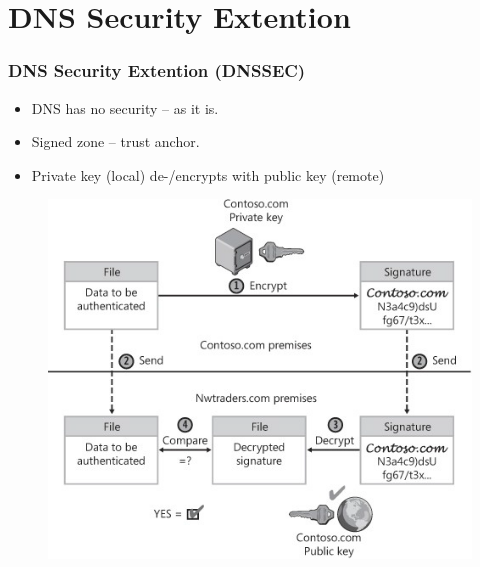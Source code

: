 \documentclass{beamer}
\begin{document}
\section{DNS Security Extention}
	\begin{frame}
		\frametitle{DNS Security Extention (DNSSEC)}
		
		
			\begin{itemize}
			\item DNS has no security -- as it is.
			\item Signed zone -- trust anchor.
			\item Private key (local) de-/encrypts with public key (remote)
			\end{itemize}
			
			\begin{figure}[hbtp]
			\centering
			\includegraphics[scale=0.5]{keys}
			\end{figure}
		
		
	\end{frame} 
 
\end{document}

